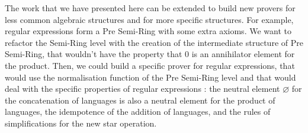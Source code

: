 The work that we have presented here can be extended to build new provers for less common algebraic structures and for more specific structures. For example, regular expressions form a Pre Semi-Ring with some extra axioms. We want to refactor the Semi-Ring level with the creation of the intermediate structure of Pre Semi-Ring, that wouldn't have the property that $0$ is an annihilator element for the product. Then, we could build a specific prover for regular expressions, that would use the normalisation function of the Pre Semi-Ring level and that would deal with the specific properties of regular expressions : the neutral element $\varnothing$ for the concatenation of languages is also a neutral element for the product of languages, the idempotence of the addition of languages, and the rules of simplifications for the new star operation.



